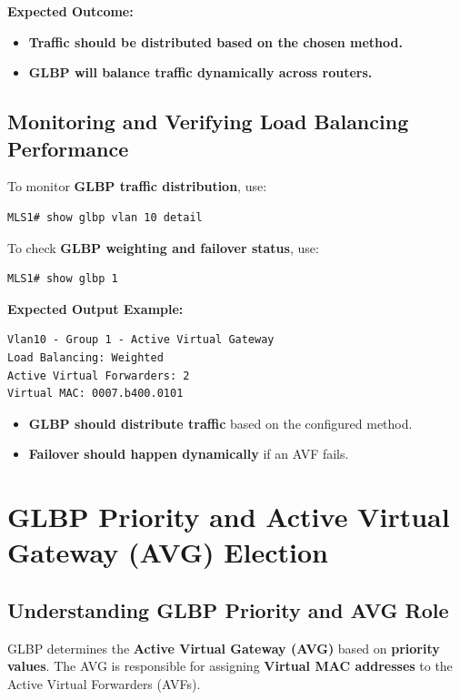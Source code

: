 \documentclass[a4paper]{book}
\begin{document}
\textbf{Expected Outcome:}
\begin{itemize}
\item \textbf{Traffic should be distributed based on the chosen method.}
\item \textbf{GLBP will balance traffic dynamically across routers.}
\end{itemize}

\subsection{Monitoring and Verifying Load Balancing Performance}
To monitor \textbf{GLBP traffic distribution}, use:
\begin{lstlisting}
MLS1# show glbp vlan 10 detail
\end{lstlisting}

To check \textbf{GLBP weighting and failover status}, use:
\begin{lstlisting}
MLS1# show glbp 1
\end{lstlisting}

\textbf{Expected Output Example:}
\begin{lstlisting}
Vlan10 - Group 1 - Active Virtual Gateway
Load Balancing: Weighted
Active Virtual Forwarders: 2
Virtual MAC: 0007.b400.0101
\end{lstlisting}
\begin{itemize}
\item \textbf{GLBP should distribute traffic} based on the configured method.
\item \textbf{Failover should happen dynamically} if an AVF fails.
\end{itemize}


\vspace{1em}

\section{GLBP Priority and Active Virtual Gateway (AVG) Election}

\subsection{Understanding GLBP Priority and AVG Role}
GLBP determines the \textbf{Active Virtual Gateway (AVG)} based on \textbf{priority values}. 
The AVG is responsible for assigning \textbf{Virtual MAC addresses} to the 
Active Virtual Forwarders (AVFs).
\end{document}
